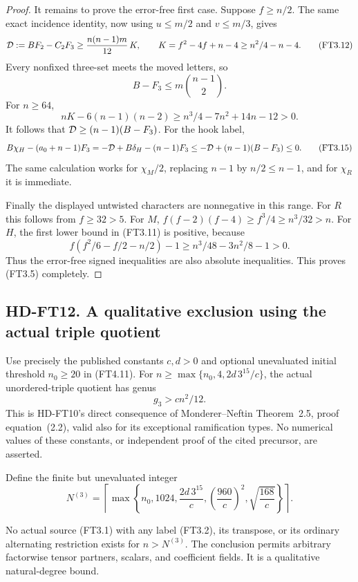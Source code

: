 \begin{proof}
It remains to prove the error-free first case.  Suppose \(f\ge n/2\).
The same exact incidence identity, now using \(u\le m/2\) and
\(v\le m/3\), gives
\[
 {\cal D}:=B F_2-C_2F_3
  \ge \frac{n(n-1)m}{12}\,K,\qquad
             K=f^2-4f+n-4\ge n^2/4-n-4.
 \tag{FT3.12}
\]
Every nonfixed three-set meets the moved letters, so
\[
 B-F_3\le m\binom{n-1}{2}.
 \tag{FT3.13}
\]
For \(n\ge64\),
\[
 nK-6(n-1)(n-2)
 \ge n^3/4-7n^2+14n-12>0.
 \tag{FT3.14}
\]
It follows that
\({\cal D}\ge(n-1)(B-F_3)\).
For the hook label,
\[
 B\chi_H-(a_0+n-1)F_3
 =-{\cal D}+B\delta_H-(n-1)F_3
 \le-{\cal D}+(n-1)(B-F_3)\le0.
 \tag{FT3.15}
\]
The same calculation works for \(\chi_M/2\), replacing \(n-1\)
by \(n/2\le n-1\), and for \(\chi_R\) it is immediate.

Finally the displayed untwisted characters are nonnegative in this
range.  For \(R\) this follows from \(f\ge32>5\).
For \(M\), \(f(f-2)(f-4)\ge f^3/4\ge n^3/32>n\).
For \(H\), the first lower bound in (FT3.11) is positive, because
\[
 f(f^2/6-f/2-n/2)-1
 \ge n^3/48-3n^2/8-1>0.
 \tag{FT3.16}
\]
Thus the error-free signed inequalities are also absolute inequalities.
This proves (FT3.5) completely.
\end{proof}

\subsection*{HD-FT12. A qualitative exclusion using the actual triple quotient}

Use precisely the published constants \(c,d>0\) and optional
unevaluated initial threshold \(n_0\ge20\) in (FT4.11).
For \(n\ge\max\{n_0,4,2d\,3^{15}/c\}\), the actual unordered-triple
quotient has genus
\[
                         g_3>cn^2/12.
 \tag{FT3.17}
\]
This is HD-FT10's direct consequence of Monderer--Neftin
Theorem~2.5, proof equation~(2.2), valid also for its exceptional
ramification types.  No numerical values of these constants, or
independent proof of the cited precursor, are asserted.

Define the finite but unevaluated integer
\[
 N^{(3)}=\left\lceil
 \max\left\{n_0,1024,\frac{2d\,3^{15}}c,
               \left(\frac{960}c\right)^2,\sqrt{\frac{168}c}\right\}
                  \right\rceil.
 \tag{FT3.18}
\]

\begin{theorem}[HD-FT12]
No actual source (FT3.1) with any label (FT3.2), its transpose,
or its ordinary alternating restriction exists for \(n>N^{(3)}\).
The conclusion permits arbitrary factorwise tensor partners, scalars,
and coefficient fields.  It is a qualitative natural-degree bound.
\end{theorem}

